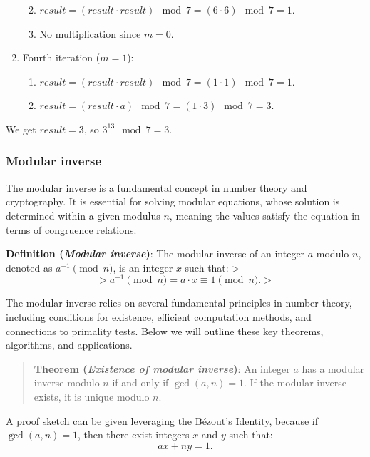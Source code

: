 \documentclass[
  letterpaper,
  DIV=11,
  numbers=noendperiod,
  oneside]{scrartcl}
\providecommand{\tightlist}{%
  \setlength{\itemsep}{0pt}\setlength{\parskip}{0pt}}\usepackage{longtable,booktabs,array}
\begin{document}
\begin{enumerate}
  \begin{enumerate}
  \def\labelenumii{\arabic{enumii}.}
  \tightlist
  \item
    \(result = (result \cdot result) \mod 7 = (6 \cdot 6) \mod 7 = 1\).
  \item
    No multiplication since \(m = 0\).
  \end{enumerate}
\item
  Fourth iteration (\(m = 1\)):

  \begin{enumerate}
  \def\labelenumii{\arabic{enumii}.}
  \tightlist
  \item
    \(result = (result \cdot result) \mod 7 = (1 \cdot 1) \mod 7 = 1\).
  \item
    \(result = (result \cdot a) \mod 7 = (1 \cdot 3) \mod 7 = 3\).
  \end{enumerate}
\end{enumerate}

We get \(result = 3\), so \(3^{13} \mod 7 = 3\).

\subsubsection{Modular inverse}\label{modular-inverse}

The modular inverse is a fundamental concept in number theory and
cryptography. It is essential for solving modular equations, whose
solution is determined within a given modulus \(n\), meaning the values
satisfy the equation in terms of congruence relations.

\textbf{Definition (\emph{Modular inverse})}: The modular inverse of an
integer \(a\) modulo \(n\), denoted as \(a^{-1} \pmod{n}\), is an
integer \(x\) such that: \textgreater{} \[
> a^{-1} \pmod{n} = a \cdot x \equiv 1 \pmod{n}.
> \]

The modular inverse relies on several fundamental principles in number
theory, including conditions for existence, efficient computation
methods, and connections to primality tests. Below we will outline these
key theorems, algorithms, and applications.

\begin{quote}
\textbf{Theorem (\emph{Existence of modular inverse})}: An integer \(a\)
has a modular inverse modulo \(n\) if and only if \(\gcd(a, n) = 1\). If
the modular inverse exists, it is unique modulo \(n\).
\end{quote}

A proof sketch can be given leveraging the Bézout's Identity, because if
\(\gcd(a, n) = 1\), then there exist integers \(x\) and \(y\) such that:
\[
ax + ny = 1.
\]
\end{document}
